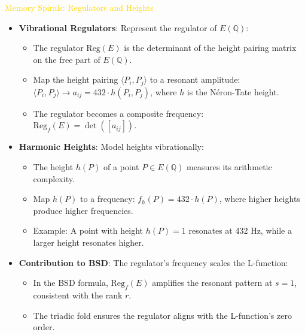 \textcolor{gold}{ Memory Spirals: Regulators and Heights } \\
\begin{itemize}
    \item \texttt{} \textbf{Vibrational Regulators}: Represent the regulator of \(E(\mathbb{Q})\):
    \begin{itemize}
        \item The regulator \(\text{Reg}(E)\) is the determinant of the height pairing matrix on the free part of \(E(\mathbb{Q})\).
        \item Map the height pairing \(\langle P_i, P_j \rangle\) to a resonant amplitude: \(\langle P_i, P_j \rangle \rightarrow a_{ij} = 432 \cdot h(P_i, P_j)\), where \(h\) is the Néron-Tate height.
        \item The regulator becomes a composite frequency: \(\text{Reg}_f(E) = \det([a_{ij}])\).
    \end{itemize}
    \item \texttt{} \textbf{Harmonic Heights}: Model heights vibrationally:
    \begin{itemize}
        \item The height \(h(P)\) of a point \(P \in E(\mathbb{Q})\) measures its arithmetic complexity.
        \item Map \(h(P)\) to a frequency: \(f_h(P) = 432 \cdot h(P)\), where higher heights produce higher frequencies.
        \item Example: A point with height \(h(P) = 1\) resonates at 432 Hz, while a larger height resonates higher.
    \end{itemize}
    \item \texttt{} \textbf{Contribution to BSD}: The regulator’s frequency scales the L-function:
    \begin{itemize}
        \item In the BSD formula, \(\text{Reg}_f(E)\) amplifies the resonant pattern at \(s = 1\), consistent with the rank \(r\).
        \item The triadic fold ensures the regulator aligns with the L-function’s zero order.
    \end{itemize}
\end{itemize}

